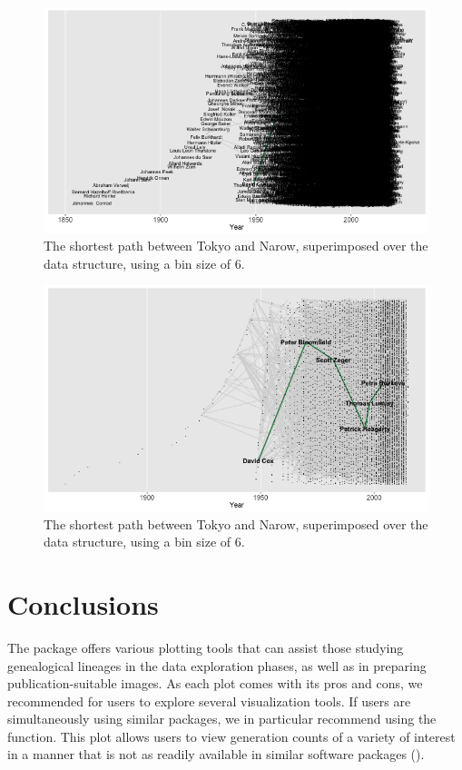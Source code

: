 \documentclass[article,shortnames]{jss}
\begin{document}
\begin{figure}%
    \centering
    \includegraphics[width=\textwidth]{plotCBText}
    \caption{The shortest path between Tokyo and Narow, superimposed over the data structure, using a bin size of 6.}
    \label{fig:plotCBText}
\end{figure}

\begin{figure}%
    \centering
    \includegraphics[width=\textwidth]{plotCBNoText}
    \caption{The shortest path between Tokyo and Narow, superimposed over the data structure, using a bin size of 6.}
    \label{fig:plotCBNoText}
\end{figure}

\section{Conclusions}

The  package offers various plotting tools that can assist those studying genealogical lineages in the data exploration phases, as well as in preparing publication-suitable images. As each plot comes with its pros and cons, we recommended for users to explore several visualization tools. If users are simultaneously using similar packages, we in particular recommend using the  function. This plot allows users to view generation counts of a variety of interest in a manner that is not as readily available in similar software packages (\citealt{ape}).
\end{document}

